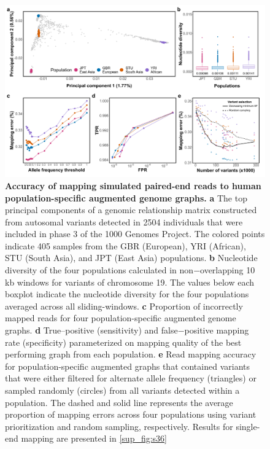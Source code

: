 \documentclass[../main.tex]{subfiles}
\begin{document}
\begin{figure}[!htb]
    \centering
    \includegraphics[width=\textwidth]{paper2/main_figure/Fig3.pdf}
    \caption[Human vs cattle genome graphs]{\textbf{Accuracy of mapping simulated paired-end reads to human population-specific augmented genome graphs.}
    \small{\textbf{a} The top principal components of a genomic relationship matrix constructed from autosomal variants detected in 2504 individuals that were included in phase 3 of the 1000 Genomes Project. The colored points indicate 405 samples from the GBR (European), YRI (African), STU (South Asia), and JPT (East Asia) populations. \textbf{b} Nucleotide diversity of the four populations calculated in non$-$overlapping 10 kb windows for variants of chromosome 19. The values below each boxplot indicate the nucleotide diversity for the four populations averaged across all sliding-windows. \textbf{c} Proportion of incorrectly mapped reads for four population-specific augmented genome graphs. \textbf{d} 
    True$–$positive (sensitivity) and false$-$positive mapping rate (specificity) parameterized on mapping quality of the best performing graph from each population. \textbf{e} Read mapping accuracy for population-specific augmented graphs that contained variants that were either filtered for alternate allele frequency (triangles) or sampled randomly (circles) from all variants detected within a population. The dashed and solid line represents the average proportion of mapping errors across four populations using variant prioritization and random sampling, respectively. Results for single-end mapping are presented in \ref{sup_fig:s36}}}
    \label{fig33:hum}
\end{figure}
\end{document}
